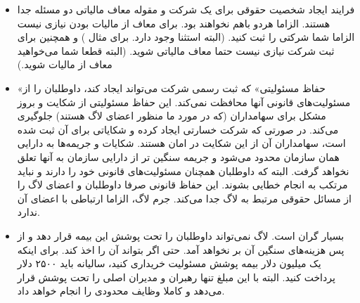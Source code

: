 \begin{itemize}
\item
فرایند ایجاد شخصیت حقوقی برای یک شرکت و مقوله معاف مالیاتی
دو مسئله جدا هستند. الزاما هردو باهم نخواهند بود. برای معاف از مالیات
بودن نیازی نیست الزاما شما شرکتی را ثبت کنید. (البته استثنا وجود دارد.
برای مثال
)
و همچنین برای ثبت شرکت نیازی نیست حتما معاف مالیاتی شوید.
(البته قطعا شما می‌خواهید معاف از مالیات شوید.)

\item
«حفاظ مسئولیتی» که ثبت رسمی شرکت می‌تواند ایجاد کند، داوطلبان را از
مسئولیت‌های قانونی آنها محافظت نمی‌کند. این حفاظ مسئولیتی از شکایت و
بروز مشکل برای سهامداران (که در مورد ما منظور اعضای لاگ هستند) جلوگیری
می‌کند. در صورتی که شرکت خسارتی ایجاد کرده و شکایاتی برای آن ثبت شده است،
سهامداران آن از این شکایت در امان هستند. شکایات و جریمه‌ها به دارایی همان
سازمان محدود می‌شود و جریمه سنگین تر از دارایی سازمان به آنها تعلق نخواهد گرفت.
البته که داوطلبان همچنان مسئولیت‌های قانونی خود را دارند و نباید مرتکب به
انجام خطایی بشوند. این حفاظ قانونی صرفا داوطلبان و اعضای لاگ را از مسائل
حقوقی مرتبط به لاگ جدا می‌کند. جرم لاگ، الزاما ارتباطی با اعضای آن ندارد.

\item

بسیار گران است. لاگ نمی‌تواند داوطلبان را تحت پوشش این بیمه قرار دهد و
از پس هزینه‌های سنگین آن بر نخواهد آمد. حتی اگر بتواند آن را اخذ کند.
برای اینکه یک میلیون دلار بیمه پوشش مسئولیت خریداری کنید، سالیانه باید
۲۵۰۰ دلار پرداخت کنید. البته با این مبلغ تنها رهبران و مدیران اصلی را تحت
پوشش قرار می‌دهد و کاملا وظایف محدودی را انجام خواهد داد.


\end{itemize}
